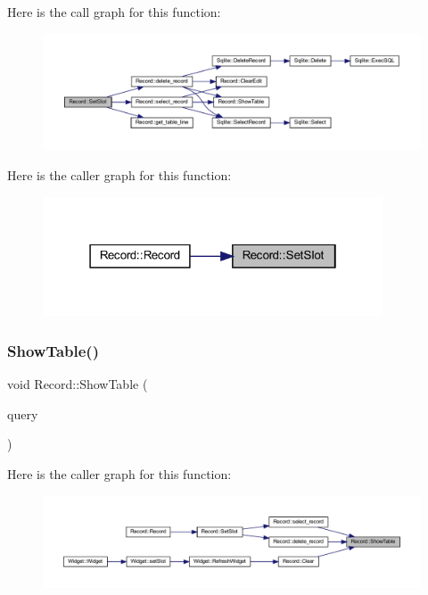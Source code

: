 Here is the call graph for this function\+:
\nopagebreak
\begin{figure}[H]
\begin{center}
\leavevmode
\includegraphics[width=350pt]{class_record_acc7b3423b809a15465c21f51353392d5_cgraph}
\end{center}
\end{figure}
Here is the caller graph for this function\+:
\nopagebreak
\begin{figure}[H]
\begin{center}
\leavevmode
\includegraphics[width=286pt]{class_record_acc7b3423b809a15465c21f51353392d5_icgraph}
\end{center}
\end{figure}
\mbox{\label{class_record_aa1e340f0b1a776819d30d23c1424cbd2}} 
\subsubsection{\texorpdfstring{ShowTable()}{ShowTable()}}
{\footnotesize\ttfamily void Record\+::\+Show\+Table (\begin{DoxyParamCaption}\item[{Q\+Sql\+Query}]{query }\end{DoxyParamCaption})}

Here is the caller graph for this function\+:
\nopagebreak
\begin{figure}[H]
\begin{center}
\leavevmode
\includegraphics[width=350pt]{class_record_aa1e340f0b1a776819d30d23c1424cbd2_icgraph}
\end{center}
\end{figure}


